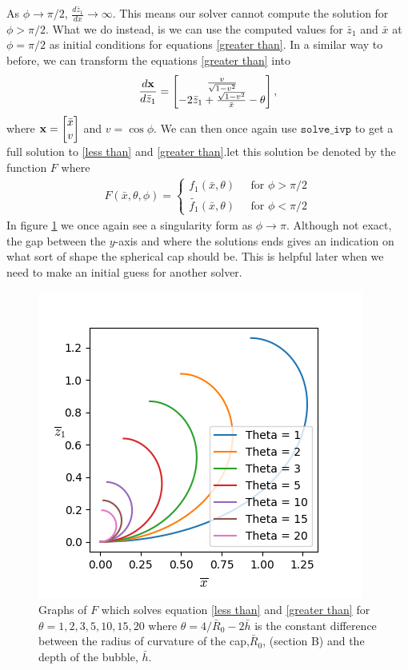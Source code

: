 As $\phi \rightarrow \pi/2$, $\frac{d\bar{z}_1}{dx} \rightarrow \infty$. This means our solver cannot compute the solution for $\phi> \pi/2$. What we do instead, is we can use the computed values for $\bar{z}_1$ and $\bar{x}$ at $\phi=\pi/2$ as initial conditions for equations \ref{greater than}. In a similar way to before, we can transform the equations \ref{greater than} into
\begin{align}
     \frac{d\bf{x}}{d\bar{z}_1}=\begin{bmatrix}
           \frac{v}{\sqrt{1-v^2}} \\
           -2\bar{z}_1 + \frac{\sqrt{1-v^2}}{\bar{x}}-\theta \\
         \end{bmatrix},
\end{align}
where $ \bf{x} = \begin{bmatrix}
    \bar{x}\\v
\end{bmatrix}$ and $v=\cos\phi$. We can then once again use $\texttt{solve\_ivp}$ to get a full solution to \ref{less than} and \ref{greater than}.let this solution be denoted by the function $F$ where
\begin{align}
    F(\bar{x},\theta,\phi)= \begin{cases}
        f_1(\bar{x},\theta) \;\;\;\;\; \text{for } \phi>\pi/2\\
        \tilde{f_1}(\bar{x},\theta) \;\;\;\;\; \text{for } \phi<\pi/2
    \end{cases}
\end{align}
In figure \ref{fig:6} we once again see a singularity form as $\phi \rightarrow \pi$. Although not exact, the gap between the $y$-axis and where the solutions ends gives an indication on what sort of shape the spherical cap should be. This is helpful later when we need to make an initial guess for another solver.
\begin{figure}
    \centering
    \includegraphics[width=0.65\linewidth]{WriteUp/images/top and bottom curve.png}
    \caption{Graphs of $F$ which solves equation \ref{less than} and \ref{greater than} for $\theta=1,2,3,5,10,15,20$ where $\theta = 4/\bar{R}_0 - 2\bar{h}$ is the constant difference between the radius of curvature of the cap,$\bar{R}_0$, (section B) and the depth of the bubble, $\bar{h}$.}
    \label{fig:6}
\end{figure}

